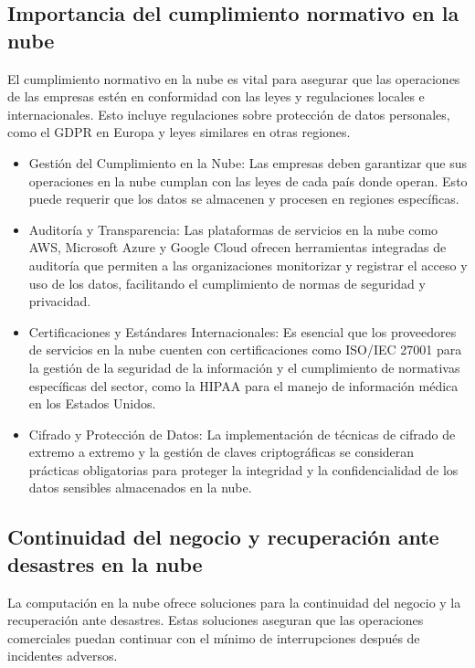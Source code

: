 {            \subsection[La normativa y la nube]{Importancia del cumplimiento normativo en la nube}
            
            El cumplimiento normativo en la nube es vital para asegurar que las operaciones de las empresas est{\'e}n en conformidad con las leyes y regulaciones locales e internacionales. Esto incluye regulaciones sobre protecci{\'o}n de datos personales, como el GDPR en Europa y leyes similares en otras regiones.
            
            \begin{itemize}
                \item Gesti{\'o}n del Cumplimiento en la Nube: Las empresas deben garantizar que sus operaciones en la nube cumplan con las leyes de cada pa{\'i}s donde operan. Esto puede requerir que los datos se almacenen y procesen en regiones espec{\'i}ficas.
                \item Auditor{\'i}a y Transparencia: Las plataformas de servicios en la nube como AWS, Microsoft Azure y Google Cloud ofrecen herramientas integradas de auditor{\'i}a que permiten a las organizaciones monitorizar y registrar el acceso y uso de los datos, facilitando el cumplimiento de normas de seguridad y privacidad.
                \item Certificaciones y Est{\'a}ndares Internacionales: Es esencial que los proveedores de servicios en la nube cuenten con certificaciones como ISO/IEC 27001 para la gesti{\'o}n de la seguridad de la informaci{\'o}n y el cumplimiento de normativas espec{\'i}ficas del sector, como la HIPAA para el manejo de informaci{\'o}n m{\'e}dica en los Estados Unidos.
                \item Cifrado y Protecci{\'o}n de Datos: La implementaci{\'o}n de t{\'e}cnicas de cifrado de extremo a extremo y la gesti{\'o}n de claves criptogr{\'a}ficas se consideran pr{\'a}cticas obligatorias para proteger la integridad y la confidencialidad de los datos sensibles almacenados en la nube.
            \end{itemize}
            
            
        \subsection[Recuperaci{\'o}n ante desastres en la nube]{Continuidad del negocio y recuperaci{\'o}n ante desastres en la nube}
            La computaci{\'o}n en la nube ofrece soluciones para la continuidad del negocio y la recuperaci{\'o}n ante desastres. Estas soluciones aseguran que las operaciones comerciales puedan continuar con el m{\'i}nimo de interrupciones despu{\'e}s de incidentes adversos.
            
}
